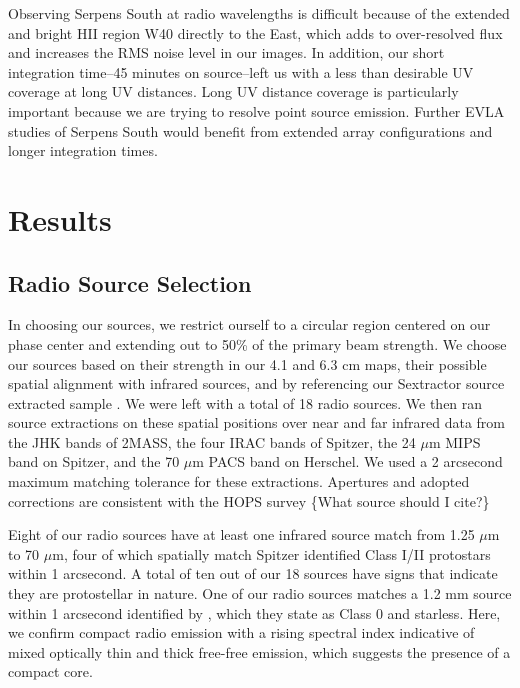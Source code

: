 \documentclass[apj]{emulateapj}
\begin{document}
Observing Serpens South at radio wavelengths is difficult because of the extended and bright HII region W40 directly to the East, which adds to over-resolved flux and increases the RMS noise level in our images. In addition, our short integration time--45 minutes on source--left us with a less than desirable UV coverage at long UV distances. Long UV distance coverage is particularly important because we are trying to resolve point source emission. Further EVLA studies of Serpens South would benefit from extended array configurations and longer integration times.

\section{Results}
\label{sec:results}

\subsection{Radio Source Selection}
In choosing our sources, we restrict ourself to a circular region centered on our phase center and extending out to 50\% of the primary beam strength. We choose our sources based on their strength in our 4.1 and 6.3 cm maps, their possible spatial alignment with infrared sources, and by referencing our Sextractor source extracted sample \citep{Bertin96}. We were left with a total of 18 radio sources. We then ran source extractions on these spatial positions over near and far infrared data from the JHK bands of 2MASS, the four IRAC bands of Spitzer, the 24 $\mu$m MIPS band on Spitzer, and the 70 $\mu$m PACS band on Herschel. We used a 2 arcsecond maximum matching tolerance for these extractions. Apertures and adopted corrections are consistent with the HOPS survey \{What source should I cite?\}

Eight of our radio sources have at least one infrared source match from 1.25 $\mu$m to 70 $\mu$m, four of which spatially match Spitzer identified Class I/II protostars within 1 arcsecond. A total of ten out of our 18 sources have signs that indicate they are protostellar in nature. One of our radio sources matches a 1.2 mm source within 1 arcsecond identified by \citep{Maury11}, which they state as Class 0 and starless. Here, we confirm compact radio emission with a rising spectral index indicative of mixed optically thin and thick free-free emission, which suggests the presence of a compact core.
\end{document}
